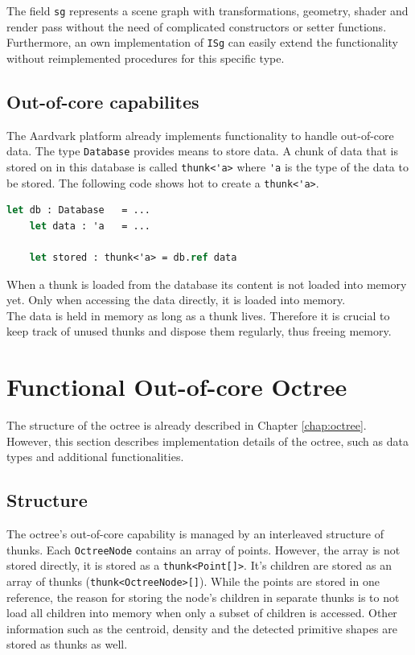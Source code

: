 The field \verb|sg| represents a scene graph with transformations, geometry, shader and render pass without the need of complicated constructors or setter functions. Furthermore, an own implementation of \verb|ISg| can easily extend the functionality without reimplemented procedures for this specific type. 


\subsection{Out-of-core capabilites}
The Aardvark platform already implements functionality to handle out-of-core data. The type \verb|Database| provides means to store data. A chunk of data that is stored on in this database is called \verb|thunk<'a>| where \verb|'a| is the type of the data to be stored. The following code shows hot to create a \verb|thunk<'a>|. 

\begin{lstlisting}[language = FSharp]
	let db : Database	= ...
	let data : 'a 	= ...
	
	let stored : thunk<'a> = db.ref data
\end{lstlisting}
When a thunk is loaded from the database its content is not loaded into memory yet. Only when accessing the data directly, it is loaded into memory. 
\\
The data is held in memory as long as a thunk lives. Therefore it is crucial to keep track of unused thunks and dispose them regularly, thus freeing memory. 
 

\section{Functional Out-of-core Octree}

The structure of the octree is already described in Chapter \ref{chap:octree}. However, this section describes implementation details of the octree, such as data types and additional functionalities. 

\subsection{Structure}

The octree's out-of-core capability is managed by an interleaved structure of thunks. Each \verb|OctreeNode| contains an array of points. However, the array is not stored directly, it is stored as a \verb|thunk<Point[]>|. It's children are stored as an array of thunks (\verb|thunk<OctreeNode>[]|). While the points are stored in one reference, the reason for storing the node's children in separate thunks is to not load all children into memory when only a subset of children is accessed. Other information such as the centroid, density and the detected primitive shapes are stored as thunks as well. 


